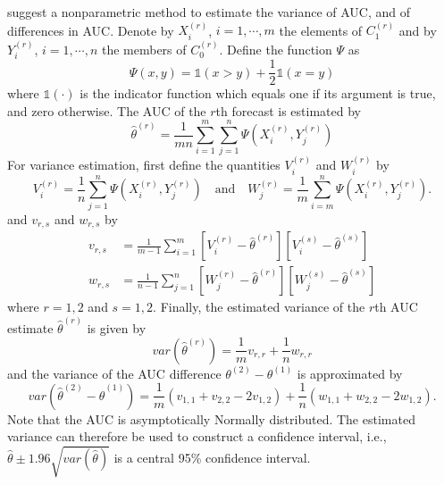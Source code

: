 \documentclass[article]{jss}\usepackage{graphicx, color}
\begin{document}
\citet{delong1988comparing} suggest a nonparametric method to estimate the variance of AUC, and of differences in AUC.
Denote by $X^{(r)}_i$, $i=1,\cdots,m$ the elements of $C^{(r)}_1$ and by $Y^{(r)}_i$, $i=1,\cdots,n$ the members of $C^{(r)}_0$.
Define the function $\Psi$ as
%
\begin{equation}
\Psi(x,y) = \mathds{1}(x>y) + \frac{1}{2} \mathds{1}(x=y)
\end{equation}
%
where $\mathds{1}(\cdot)$ is the indicator function which equals one if its argument is true, and zero otherwise.
The AUC of the $r$th forecast is estimated by 
%
\begin{equation}
\hat\theta^{(r)} = \frac{1}{mn} \sum_{i=1}^m \sum_{j=1}^n \Psi\left(X^{(r)}_i, Y^{(r)}_j\right)
\end{equation}
%
For variance estimation, first define the quantities $V_i^{(r)}$ and $W_i^{(r)}$ by
%
\begin{equation}
V_i^{(r)} = \frac1n \sum_{j=1}^n \Psi\left(X^{(r)}_i, Y^{(r)}_j\right)\quad\text{and}\quad W_j^{(r)} = \frac1m \sum_{i=m}^n \Psi\left(X^{(r)}_i, Y^{(r)}_j\right).
\end{equation}
%
and $v_{r,s}$ and $w_{r,s}$ by
%
\begin{align}
v_{r,s} & = \frac{1}{m-1} \sum_{i=1}^m \left[V_i^{(r)} - \hat\theta^{(r)}\right]\left[V_i^{(s)} - \hat\theta^{(s)}\right]\\
w_{r,s} & = \frac{1}{n-1} \sum_{j=1}^n \left[W_j^{(r)} - \hat\theta^{(r)}\right]\left[W_j^{(s)} - \hat\theta^{(s)}\right]
\end{align}
%
where $r=1,2$ and $s=1,2$.
Finally, the estimated variance of the $r$th AUC estimate $\hat\theta^{(r)}$ is given by
%
\begin{equation}
var\left(\hat\theta^{(r)}\right) = \frac{1}{m} v_{r,r} + \frac{1}{n} w_{r,r}
\end{equation}
%
and the variance of the AUC difference $\theta^{(2)} - \theta^{(1)}$ is approximated by
%
\begin{equation}
var\left(\hat\theta^{(2)} - \hat\theta^{(1)}\right) = \frac{1}{m} (v_{1,1} + v_{2,2} - 2 v_{1,2}) + \frac{1}{n} (w_{1,1} + w_{2,2} - 2 w_{1,2}).
\end{equation}
%
Note that the AUC is asymptotically Normally distributed.
The estimated variance can therefore be used to construct a confidence interval, i.e., $\hat\theta \pm 1.96 \sqrt{var(\hat\theta)}$ is a central 95\% confidence interval.
\end{document}

